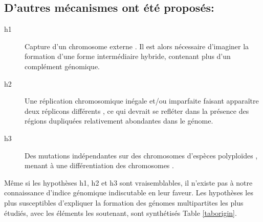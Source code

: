 \subsection*{D'autres mécanismes ont été proposés:}
	 \begin{description}
	 \item[h1] Capture d'un chromosome externe \citep{Moreno1998,Mackenzie2004}. Il est alors nécessaire d'imaginer la formation d'une forme intermédiaire hybride, contenant plus d'un complément génomique.
	 \item[h2] Une réplication chromosomique inégale et/ou imparfaite faisant apparaître deux réplicons différents \citep{Moreno1998}, ce qui devrait se refléter dans la présence des régions dupliquées relativement abondantes dans le génome.
	 \item[h3]  Des mutations indépendantes sur des chromosomes d'espèces polyploïdes \citep{Moreno1998}, menant à une différentiation des chromosomes .
\end{description}

Même si les hypothèses h1, h2 et h3 sont vraisemblables, il n'existe pas à notre connaissance d'indice génomique indiscutable en leur faveur. Les hypothèses les plus susceptibles d'expliquer la formation des génomes multipartites les plus étudiés, avec les éléments les soutenant, sont synthétisés Table \ref{taborigin}.



